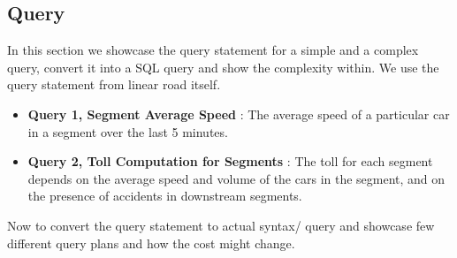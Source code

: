 \subsection{Query}
In this section we showcase the query statement for a simple and a complex query, convert it into a SQL query and show the complexity within. We use the query statement from linear road itself.
\begin{itemize}
    \item \textbf{Query 1, Segment Average Speed } : The average speed of a particular car in a segment over the last 5 minutes. 
    \item \textbf{Query 2, Toll Computation for Segments} : The toll for each segment depends on the average speed and volume of the cars in the segment, and on the presence of accidents in downstream segments. 
\end{itemize}
Now to convert the query statement to actual syntax/ query and showcase few different query plans and how the cost might change.

